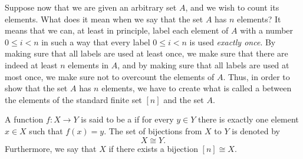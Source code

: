 Suppose now that we are given an arbitrary set $A$,
and we wish to count its elements.
What does it mean when we say that the set $A$ has $n$ elements?
It means that we can, at least in principle,
label each element of $A$ with a number $0\leq i<n$ in such a way that every label $0\leq i<n$ is used \emph{exactly once}.
By making sure that all labels are used at least once, we make sure that there are indeed at least $n$ elements in $A$, and by making sure that all labels are used at most once, we make sure not to overcount the elements of $A$. Thus,
in order to show that the set $A$ has $n$ elements,
we have to create what is called a  between the elements of the standard finite set $[n]$ and the set $A$.

\begin{definition}
  A function $f:X\to Y$ is said to be a  if for every $y\in Y$ there is exactly one element $x\in X$ such that $f(x)=y$.
  The set of bijections from $X$ to $Y$ is denoted by
  \begin{equation*}
    X\cong Y.
  \end{equation*}
  Furthermore, we say that $X$  if there exists a bijection $[n]\cong X$.
\end{definition}

